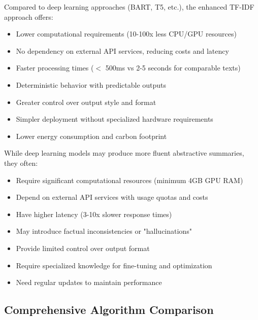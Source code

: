 \documentclass[12pt,a4paper]{article}
\begin{document}
Compared to deep learning approaches (BART, T5, etc.), the enhanced TF-IDF approach offers:

\begin{itemize}
    \item Lower computational requirements (10-100x less CPU/GPU resources)
    \item No dependency on external API services, reducing costs and latency
    \item Faster processing times ($<$ 500ms vs 2-5 seconds for comparable texts)
    \item Deterministic behavior with predictable outputs
    \item Greater control over output style and format
    \item Simpler deployment without specialized hardware requirements
    \item Lower energy consumption and carbon footprint
\end{itemize}

While deep learning models may produce more fluent abstractive summaries, they often:
\begin{itemize}
    \item Require significant computational resources (minimum 4GB GPU RAM)
    \item Depend on external API services with usage quotas and costs
    \item Have higher latency (3-10x slower response times)
    \item May introduce factual inconsistencies or "hallucinations"
    \item Provide limited control over output format
    \item Require specialized knowledge for fine-tuning and optimization
    \item Need regular updates to maintain performance
\end{itemize}

\subsection{Comprehensive Algorithm Comparison}
\end{document}
